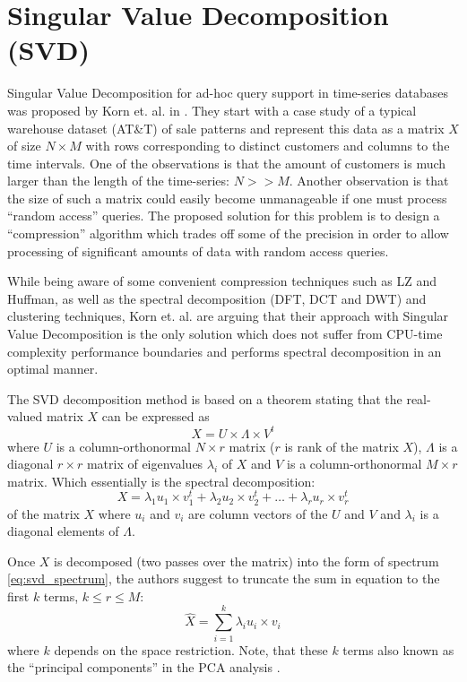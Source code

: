 \section{Singular Value Decomposition (SVD)}
Singular Value Decomposition for ad-hoc query support in time-series databases was proposed by Korn et. al. in \cite{citeulike:4373332}. They start with a case study of a typical warehouse dataset (AT\&T) of sale patterns and represent this data as a matrix $X$ of size $N \times M$ with rows corresponding to distinct customers and columns to the time intervals. One of the observations is that the amount of customers is much larger than the length of the time-series: $N>>M$. Another observation is that the size of such a matrix could easily become unmanageable if one must process ``random access'' queries. The proposed solution for this problem is to design a ``compression'' algorithm which trades off some of the precision in order to allow processing of significant amounts of data with random access queries. 

While being aware of some convenient compression techniques such as LZ and Huffman, as well as the spectral decomposition (DFT, DCT and DWT) and clustering techniques, Korn et. al. are arguing that their approach with Singular Value Decomposition is the only solution which does not suffer from CPU-time complexity performance boundaries and performs spectral decomposition in an optimal manner.

The SVD decomposition method is based on a theorem stating that the real-valued matrix $X$ can be expressed as 
\begin{equation}
X = U \times \Lambda \times V^{t}
\label{eq:svd_transform}
\end{equation}
where $U$ is a column-orthonormal $N \times r$ matrix ($r$ is rank of the matrix $X$), $\Lambda$ is a diagonal $r \times r$ matrix of eigenvalues $\lambda_{i}$ of $X$ and $V$ is a column-orthonormal $M \times r$ matrix. Which essentially is the spectral decomposition:
\begin{equation}
X = \lambda_{1} u_{1} \times v_{1}^{t} + \lambda_{2} u_{2} \times v_{2}^{t} + \ldots + \lambda_{r} u_{r} \times v_{r}^{t}
\label{eq:svd_spectrum}
\end{equation}
of the matrix $X$ where $u_{i}$ and $v_{i}$ are column vectors of the $U$ and $V$ and $\lambda_{i}$ is a diagonal elements of $\Lambda$.

Once $X$ is decomposed (two passes over the matrix) into the form of spectrum \ref{eq:svd_spectrum}, the authors suggest to truncate the sum in equation to the first $k$ terms, $k \leq r \leq M$:
\begin{equation}
\hat{X} = \sum_{i=1}^{k} \lambda_{i} u_{i} \times v_{i}
\label{eq:svd}
\end{equation}
where $k$ depends on the space restriction. Note, that these $k$ terms also known as the ``principal components'' in the PCA analysis \cite{citeulike:167581}. 


